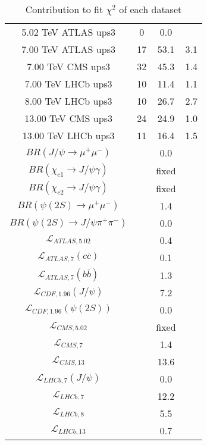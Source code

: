 \begin{table}[h!]
\begin{tabular}{c|c|c|c}
5.02 TeV ATLAS ups3 & 0 & 0.0 &  \\
7.00 TeV ATLAS ups3 & 17 & 53.1 & 3.1 \\
7.00 TeV CMS ups3 & 32 & 45.3 & 1.4 \\
7.00 TeV LHCb ups3 & 10 & 11.4 & 1.1 \\
8.00 TeV LHCb ups3 & 10 & 26.7 & 2.7 \\
13.00 TeV CMS ups3 & 24 & 24.9 & 1.0 \\
13.00 TeV LHCb ups3 & 11 & 16.4 & 1.5 \\
\hline
$BR(J/\psi\rightarrow\mu^+\mu^-)$ &  & 0.0 &  \\
$BR(\chi_{c1}\rightarrow J/\psi\gamma)$ &  & fixed & \\
$BR(\chi_{c2}\rightarrow J/\psi\gamma)$ &  & fixed & \\
$BR(\psi(2S)\rightarrow\mu^+\mu^-)$ &  & 1.4 &  \\
$BR(\psi(2S)\rightarrow J/\psi\pi^+\pi^-)$ &  & 0.0 &  \\
$\mathcal L_{ATLAS,5.02}$ &  & 0.4 &  \\
$\mathcal L_{ATLAS,7}(c\overline c)$ &  & 0.1 &  \\
$\mathcal L_{ATLAS,7}(b\overline b)$ &  & 1.3 &  \\
$\mathcal L_{CDF,1.96}(J/\psi)$ &  & 7.2 &  \\
$\mathcal L_{CDF,1.96}(\psi(2S))$ &  & 0.0 &  \\
$\mathcal L_{CMS,5.02}$ &  & fixed & \\
$\mathcal L_{CMS,7}$ &  & 1.4 &  \\
$\mathcal L_{CMS,13}$ &  & 13.6 &  \\
$\mathcal L_{LHCb,7}(J/\psi)$ &  & 0.0 &  \\
$\mathcal L_{LHCb,7}$ &  & 12.2 &  \\
$\mathcal L_{LHCb,8}$ &  & 5.5 &  \\
$\mathcal L_{LHCb,13}$ &  & 0.7 &  \\
\end{tabular}
\caption{Contribution to fit $\chi^2$ of each dataset}
\end{table}
